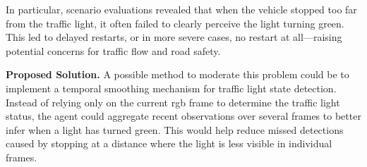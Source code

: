 In particular, scenario evaluations revealed that when the vehicle stopped too far from the traffic light, it often failed to clearly perceive the light turning green. This led to delayed restarts, or in more severe cases, no restart at all—raising potential concerns for traffic flow and road safety.

\noindent\textbf{Proposed Solution.} A possible method to moderate this problem could be to implement a temporal smoothing mechanism for traffic light state detection. Instead of relying only on the current rgb frame to determine the traffic light status, the agent could aggregate recent observations over several frames to better infer when a light has turned green. This would help reduce missed detections caused by stopping at a distance where the light is less visible in individual frames.

